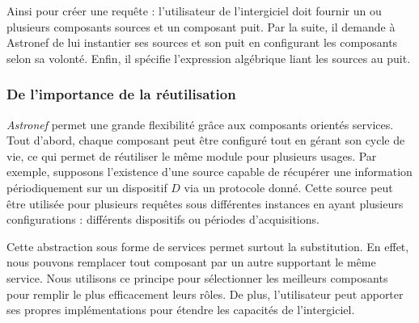 Ainsi pour créer une requête : l'utilisateur de l'intergiciel doit fournir un ou plusieurs composants sources et un composant puit. Par la suite, il demande à Astronef de lui instantier ses sources et son puit en configurant les composants selon sa volonté. Enfin, il spécifie l'expression algébrique liant les sources au puit.

\subsubsection{De l'importance de la réutilisation}
\textit{Astronef} permet une grande flexibilité grâce aux composants orientés services. Tout d'abord, chaque composant peut être configuré tout en gérant son cycle de vie, ce qui permet de réutiliser le même module pour plusieurs usages. Par exemple, supposons l'existence d'une source capable de récupérer une information périodiquement sur un dispositif $D$ via un protocole donné. Cette source peut être utilisée pour plusieurs requêtes sous différentes instances en ayant plusieurs configurations : différents dispositifs ou périodes d'acquisitions.

Cette abstraction sous forme de services permet surtout la substitution. En effet, nous pouvons remplacer tout composant par un autre supportant le même service. Nous utilisons ce principe pour sélectionner les meilleurs composants pour remplir le plus efficacement leurs rôles. De plus, l'utilisateur peut apporter ses propres implémentations pour étendre les capacités de l'intergiciel.

